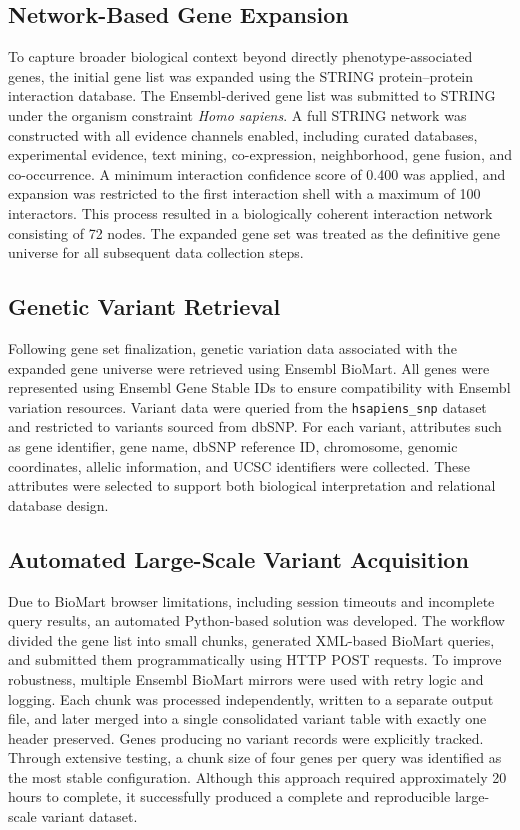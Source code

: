 \documentclass[12pt]{article}
\begin{document}
	\subsection*{Network-Based Gene Expansion}
	
	To capture broader biological context beyond directly phenotype-associated genes, the initial gene list was expanded using the STRING protein–protein interaction database. The Ensembl-derived gene list was submitted to STRING under the organism constraint \textit{Homo sapiens}. A full STRING network was constructed with all evidence channels enabled, including curated databases, experimental evidence, text mining, co-expression, neighborhood, gene fusion, and co-occurrence. A minimum interaction confidence score of 0.400 was applied, and expansion was restricted to the first interaction shell with a maximum of 100 interactors. This process resulted in a biologically coherent interaction network consisting of 72 nodes. The expanded gene set was treated as the definitive gene universe for all subsequent data collection steps.
	
	\subsection*{Genetic Variant Retrieval}
	
	Following gene set finalization, genetic variation data associated with the expanded gene universe were retrieved using Ensembl BioMart. All genes were represented using Ensembl Gene Stable IDs to ensure compatibility with Ensembl variation resources. Variant data were queried from the \texttt{hsapiens\_snp} dataset and restricted to variants sourced from dbSNP. For each variant, attributes such as gene identifier, gene name, dbSNP reference ID, chromosome, genomic coordinates, allelic information, and UCSC identifiers were collected. These attributes were selected to support both biological interpretation and relational database design.
	
	\subsection*{Automated Large-Scale Variant Acquisition}
	
	Due to BioMart browser limitations, including session timeouts and incomplete query results, an automated Python-based solution was developed. The workflow divided the gene list into small chunks, generated XML-based BioMart queries, and submitted them programmatically using HTTP POST requests. To improve robustness, multiple Ensembl BioMart mirrors were used with retry logic and logging. Each chunk was processed independently, written to a separate output file, and later merged into a single consolidated variant table with exactly one header preserved. Genes producing no variant records were explicitly tracked. Through extensive testing, a chunk size of four genes per query was identified as the most stable configuration. Although this approach required approximately 20 hours to complete, it successfully produced a complete and reproducible large-scale variant dataset.
	
\end{document}
